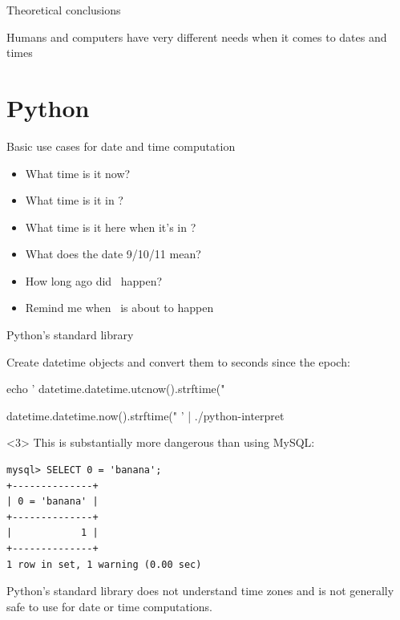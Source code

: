 \documentclass[xcolor=svgnames,17pt]{beamer}
\newcommand*{\sizefont}[1]{%
    \ifcase#1\relax
    \or \tiny
    \or \scriptsize
    \or \footnotesize
    \or \small
    \or \normalsize
    \or \large
    \or \Large
    \or \LARGE
    \or \huge
    \or \Huge
    \fi}
\begin{document}
\begin{frame}{Theoretical conclusions}

Humans and computers have very different needs when it comes to dates and
times

\end{frame}

\section{Python}

\begin{frame}
\tableofcontents[currentsection]
\end{frame}

\begin{frame}{Basic use cases for date and time computation}
\begin{itemize}
\item What time is it now?
\item What time is it in \fillinblank?
\item What time is it here when it’s \fillinblank in \fillinblank?
\item What does the date 9/10/11 mean?
\item How long ago did \fillinblank\ happen?
\item Remind me when \fillinblank\ is about to happen
\end{itemize}
\end{frame}

\begin{frame}[fragile]{Python's standard library}

Create datetime objects and convert them to seconds since the epoch:

\pause

{\sizefont{3}
\bash[stdout]
echo '
datetime.datetime.utcnow().strftime("%


datetime.datetime.now().strftime("%
' | ./python-interpret
\END
}

\pause

\begin{onlyenv}<3>
This is substantially more dangerous than using MySQL:

\sizefont{2}
\begin{verbatim}
mysql> SELECT 0 = 'banana';
+--------------+
| 0 = 'banana' |
+--------------+
|            1 |
+--------------+
1 row in set, 1 warning (0.00 sec)
\end{verbatim}
\end{onlyenv}

\pause

\alert{Python’s standard library does not understand time zones and is not
generally safe to use for date or time computations.}

\end{frame}
\end{document}
